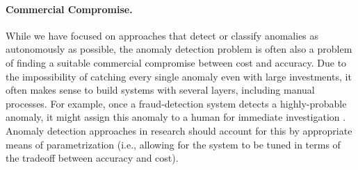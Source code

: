 \paragraph{Commercial Compromise.}
While we have focused on approaches that detect or classify anomalies as autonomously as possible, the anomaly detection problem is often also a problem of finding a suitable commercial compromise between cost and accuracy. Due to the impossibility of catching every single anomaly even with large investments, it often makes sense to build systems with several layers, including manual processes. For example, once a fraud-detection system detects a highly-probable anomaly, it might assign this anomaly to a human for immediate investigation \citep{bolton_statistical_2002}. Anomaly detection approaches in research should account for this by appropriate means of parametrization (i.e., allowing for the system to be tuned in terms of the tradeoff between accuracy and cost).
